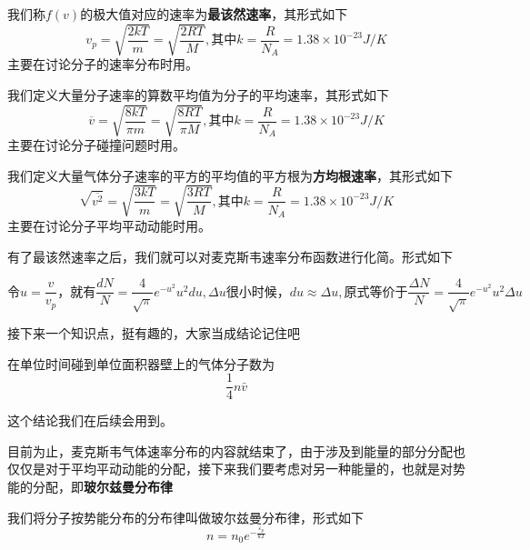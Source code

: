 \documentclass[lang=cn,10pt]{elegantbook}
\begin{document}
	 \begin{definition}[三个速率]
	 	我们称$f(v)$的极大值对应的速率为\textbf{最该然速率}，其形式如下
	 	\begin{equation*}
	 		v_p=\sqrt{\frac{2kT}{m}}=\sqrt{\frac{2RT}{M}},\text{其中}k=\frac{R}{N_{A}}=1.38\times10^{-23}J/K
	 	\end{equation*}
	 	主要在讨论分子的速率分布时用。
	 	
	 	我们定义大量分子速率的算数平均值为分子的平均速率，其形式如下
	 	\begin{equation*}
	 		\overline{v}=\sqrt{\frac{8kT}{\pi m}}=\sqrt{\frac{8RT}{\pi M}},\text{其中}k=\frac{R}{N_{A}}=1.38\times10^{-23}J/K
	 	\end{equation*}
	 	主要在讨论分子碰撞问题时用。
	 	
	 	我们定义大量气体分子速率的平方的平均值的平方根为\textbf{方均根速率}，其形式如下
	 	\begin{equation*}
	 		\sqrt{\overline{v^2}}=\sqrt{\frac{3kT}{m}}=\sqrt{\frac{3RT}{M}},\text{其中}k=\frac{R}{N_{A}}=1.38\times10^{-23}J/K
	 	\end{equation*}
	 	主要在讨论分子平均平动动能时用。
	 \end{definition}
	 
	 有了最该然速率之后，我们就可以对麦克斯韦速率分布函数进行化简。形式如下
	 
	 	\begin{equation*}
	 		\text{令}u=\frac{v}{v_p}\text{，就有}
	 		\frac{dN}{N}=\frac{4}{\sqrt{\pi}}e^{-u^2}u^2du
	 		,\varDelta u\text{很小时候，}du\approx \varDelta u,
	 		\text{原式等价于}\frac{\varDelta N}{N}=\frac{4}{\sqrt{\pi}}e^{-u^2}u^2\varDelta u
	 	\end{equation*}

	接下来一个知识点，挺有趣的，大家当成结论记住吧
	
	\begin{theorem}[单位碰壁分子数]
		在单位时间碰到单位面积器壁上的气体分子数为
		\begin{equation*}
			\frac{1}{4}n \bar{v}
		\end{equation*}
	\end{theorem}
	这个结论我们在后续会用到。
	
	目前为止，麦克斯韦气体速率分布的内容就结束了，由于涉及到能量的部分分配也仅仅是对于平均平动动能的分配，接下来我们要考虑对另一种能量的，也就是对势能的分配，即\textbf{玻尔兹曼分布律}
	
	\begin{definition}[玻尔兹曼分布律]
		我们将分子按势能分布的分布律叫做玻尔兹曼分布律，形式如下
		\begin{equation*}
			n=n_{0}e^{-\frac{\varepsilon _p}{kT}}
		\end{equation*}
	\end{definition}
	
\end{document}
